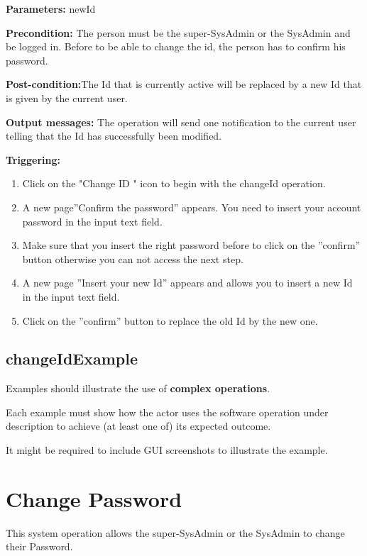 \begin{description}

\item \textbf{Parameters:} newId
\item \textbf{Precondition:} The person must be the super-SysAdmin or the
SysAdmin and be logged in. Before to be able to change the id, the person has to
confirm his password.
\item \textbf{Post-condition:}The Id that is currently active will be
replaced by a new Id that is given by the current user.
\item \textbf{Output messages:} The operation will send one notification to the
current user telling that the Id  has successfully been modified.


\item \textbf{Triggering:}
\begin{enumerate}
\item Click on the "Change ID " icon to begin with the changeId operation. 
\item A new page''Confirm the password'' appears. You need to insert your
account password in the input text field. 
\item Make sure that you insert the right password before to click on the
''confirm'' button otherwise you can not access the next step.
\item A new page ''Insert your new Id'' appears and allows you to
insert a new Id in the input text field.
\item Click on the ''confirm'' button to replace the old Id by the new one.

\end{enumerate}

 
\end{description}

 
\subsection{changeIdExample}
Examples should illustrate the use of \textbf{complex operations}.

Each example must show how the actor uses the software operation under
description to achieve (at least one of) its expected outcome.

It might be required to include GUI screenshots to illustrate the example.



\section{Change Password}
\label{operation:changePassword}
This system operation allows the super-SysAdmin or the SysAdmin to change
their Password.

